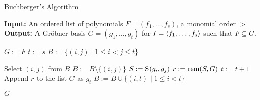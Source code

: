 \begin{latexonly}
\begin{algorithm}\label{alg:Buchberger's_Algorithm} %
    \caption{Buchberger's Algorithm}
    \begin{algorithmic}[1]
    \Statex \textbf{Input:} An ordered list of polynomials $F = (f_1, \dots, f_s)$, a monomial order $>$
    \Statex \textbf{Output:} A Gr{\"o}bner basis $G = (g_1, \dots, g_t)$ for $I = \langle f_1, \dots, f_s \rangle$ such that $F \subseteq G$.
    
    \State $G := F$ 
    \State $t := s$ 
    \State $B := \{(i, j) \mid 1 \le i < j \le t\}$ 
    
        \State Select $(i, j)$ from $B$
        \State $B := B \setminus \{(i, j)\}$
        \State $S := \operatorname{S}(g_i, g_j)$ 
        \State $r := \operatorname{rem}(S, G)$ 
            \State $t := t + 1$
            \State Append $r$ to the list $G$ as $g_t$ 
            \State $B := B \cup \{(i, t) \mid 1 \le i < t\}$ 
        \EndIf
    \EndWhile
    
    \State \Return $G$
    \end{algorithmic}
\end{algorithm}
\end{latexonly}

